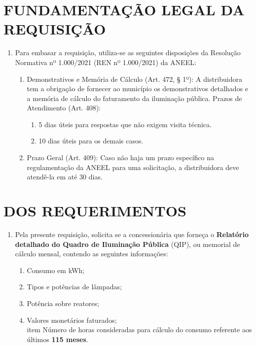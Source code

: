 \newcommand{\tipoRequerimento}{Solicitação do Quadro de Iluminação Pública}

\section{FUNDAMENTAÇÃO LEGAL DA REQUISIÇÃO}

\begin{enumerate}[resume]
\item
  Para embasar a requisição, utiliza-se as seguintes disposições da Resolução Normativa nº 1.000/2021 (REN nº 1.000/2021) da ANEEL:
  \begin{enumerate}
  \item
    Demonstrativos e Memória de Cálculo (Art. 472, § 1º): A distribuidora tem a obrigação de fornecer ao município os demonstrativos detalhados e a memória de cálculo do faturamento da iluminação pública. Prazos de Atendimento (Art. 408):
    \begin{enumerate}
      \item  
      5 dias úteis para respostas que não exigem visita técnica.
      \item 
      10 dias úteis para os demais casos.
    \end{enumerate}
  \item 
  Prazo Geral (Art. 409): Caso não haja um prazo específico na regulamentação da ANEEL para uma solicitação, a distribuidora deve atendê-la em até 30 dias.
  \end{enumerate}
\end{enumerate}

\section{DOS REQUERIMENTOS}

\begin{enumerate}[resume]
\item Pela presente requisição, solicita se a concessionária que forneça o \textbf{Relatório detalhado do Quadro de Iluminação Pública} (QIP), ou memorial de cálculo mensal, contendo as seguintes informações: 
\begin{enumerate}
  \item Consumo em kWh;
  \item Tipos e potências de lâmpadas;
  \item Potência sobre reatores;
  \item Valores monetários faturados;
  \\item Número de horas consideradas para cálculo do consumo referente aos últimos \textbf{115 meses}.
\end{enumerate}
\end{enumerate}



